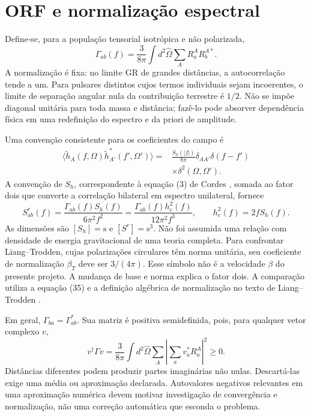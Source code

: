 \section{ORF e normalização espectral}

Define-se, para a população tensorial isotrópica e não polarizada,
\begin{equation}
 \Gamma_{ab}(f)=\frac{3}{8\pi}\int d^2\hat\Omega
             \sum_A R_a^A R_b^{A*}.
 \label{eq:pta-orf-definicao}
\end{equation}
A normalização é fixa: no limite GR de grandes distâncias, a
autocorrelação tende a um. Para pulsares distintos cujos termos
individuais sejam incoerentes, o limite de separação angular nula da
contribuição terrestre é \(1/2\). Não se impõe diagonal unitária
para toda massa e distância; fazê-lo pode absorver dependência física
em uma redefinição do espectro e da priori de amplitude.

Uma convenção consistente para os coeficientes do campo é
\begin{equation}
 \begin{aligned}
 \langle\widetilde h_A(f,\Omega)
        \widetilde h_{A'}^*(f',\Omega')\rangle
 ={}&\frac{S_h(|f|)}{8\pi}\delta_{AA'}\delta(f-f')\\
   &\times\delta^2(\Omega,\Omega').
 \end{aligned}
 \label{eq:pta-espectro-campo}
\end{equation}
A convenção de \(S_h\), correspondente à equação (3) de
Cordes \autocite{cordes2025}, somada ao fator dois que
converte a correlação bilateral em espectro unilateral, fornece
\begin{equation}
 S_{ab}^{r}(f)
 =\frac{\Gamma_{ab}(f)S_h(f)}{6\pi^2f^2}
 =\frac{\Gamma_{ab}(f)h_c^2(f)}{12\pi^2f^3},
 \qquad h_c^2(f)=2fS_h(f).
 \label{eq:pta-espectro-residuos}
\end{equation}
As dimensões são \([S_h]=\mathrm{s}\) e
\([S^r]=\mathrm{s}^3\). Não foi assumida uma relação com densidade
de energia gravitacional de uma teoria completa. Para confrontar
Liang--Trodden, cujas polarizações circulares têm norma unitária, seu
coeficiente de normalização \(\beta_T\) deve ser
\(3/(4\pi)\). Esse símbolo não é a velocidade \(\beta\) do
presente projeto. A mudança de base e norma explica o fator dois.
A comparação utiliza a equação (35) e a definição algébrica de
normalização no texto de Liang--Trodden \autocite{liang2021}.

Em geral, \(\Gamma_{ba}=\Gamma_{ab}^*\). Sua matriz é positiva
semidefinida, pois, para qualquer vetor complexo \(v\),
\begin{equation}
 v^\dagger\Gamma v
 =\frac{3}{8\pi}\int d^2\hat\Omega\sum_A
          \left|\sum_a v_a^*R_a^A\right|^2\geq0.
 \label{eq:pta-positividade}
\end{equation}
Distâncias diferentes podem produzir partes imaginárias não nulas.
Descartá-las exige uma média ou aproximação declarada. Autovalores
negativos relevantes em uma aproximação numérica devem motivar
investigação de convergência e normalização, não uma correção
automática que esconda o problema.

